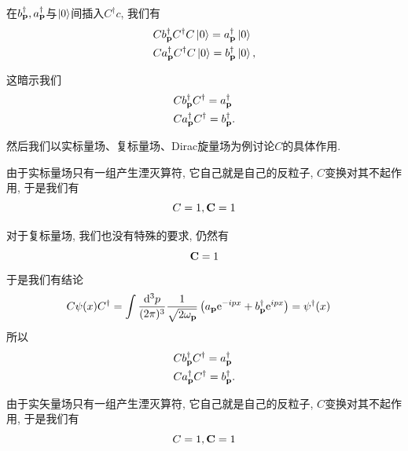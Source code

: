 在$\b{p}^\dagger, \a{p}^\dagger$与$\ket 0$间插入$C^\dagger c$, 我们有
\begin{align}
    & C\b{p}^\dagger C^\dagger C\ket0=\a{p}^\dagger\ket 0\\
    & C\a{p}^\dagger C^\dagger C\ket0=\b{p}^\dagger\ket 0,
\end{align}

这暗示我们
\begin{align}
    & C\b{p}^\dagger C^\dagger=\a{p}^\dagger\\
    & C\a{p}^\dagger C^\dagger=\b{p}^\dagger.
\end{align}

然后我们以实标量场、复标量场、Dirac旋量场为例讨论$C$的具体作用.
\begin{example}[实标量场的电荷共轭变换]
    由于实标量场只有一组产生湮灭算符, 它自己就是自己的反粒子, $C$变换对其不起作用, 于是我们有
    \begin{equation}
        C=1, \boldsymbol{\rm C}=1
    \end{equation}
\end{example}
\begin{example}[复标量场的电荷共轭变换]
    对于复标量场, 我们也没有特殊的要求, 仍然有
    \begin{equation}
        \boldsymbol{\rm C}=1
    \end{equation}
    于是我们有结论
    \begin{align}
        &C\psi(x)C^\dagger=\int\ldsq p\left(\a p\exp{-ipx}+\b p^\dagger\exp{ipx}\right)=\psi^\dagger(x)
    \end{align}
    所以
    \begin{align}
        & C\b{p}^\dagger C^\dagger=\a{p}^\dagger\\
        & C\a{p}^\dagger C^\dagger=\b{p}^\dagger.
    \end{align}
\end{example}
\begin{example}[实矢量场的电荷共轭变换]
    由于实矢量场只有一组产生湮灭算符, 它自己就是自己的反粒子, $C$变换对其不起作用, 于是我们有
    \begin{equation}
        C=1, \boldsymbol{\rm C}=1
    \end{equation}
\end{example}
